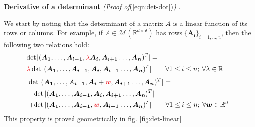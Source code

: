 \documentclass[../template.tex]{subfiles}
\begin{document}
\begin{expl}\textbf{Derivative of a determinant} \textit{(Proof of}(\ref{eqn:det-dot})\textit{)}  . \label{proof:det-dot} 

    We start by noting that the determinant of a matrix $A$ is a linear function of its rows or columns. For example, if $A \in \mathcal{M}(\mathbb{R}^{d \times d})$ has rows $\{\bm{A_i}\}_{i=1,\dots,n}$, then the following two relations hold:
    \begin{align} \label{eqn:prop1}
        \operatorname{det}|(\bm{A_1},\dots,\bm{A_{i-1}}, \textcolor{Red}{\lambda}\bm{A_i}, \bm{A_{i+1}}\dots, \bm{A_n})^T| = \\ \nonumber
       \textcolor{Red}{\lambda} \operatorname{det} | (\bm{A_1},\dots,\bm{A_{i-1}}, \bm{A_i} , \bm{A_{i+1}}\dots, \bm{A_n})^T| \qquad \forall 1 \leq i \leq n; \> \forall \lambda \in \mathbb{R} \span
    \end{align}
    \begin{align} \label{eqn:prop2}
       &\operatorname{det}|(\bm{A_1},\dots,\bm{A_{i-1}}, \bm{A_i} + \textcolor{Red}{\bm{w}}, \bm{A_{i+1}}\dots, \bm{A_n})^T| = \\ \nonumber
       &\hphantom{+}\operatorname{det} | (\bm{A_1},\dots,\bm{A_{i-1}}, \bm{A_i} , \bm{A_{i+1}}\dots, \bm{A_n})^T| +\\ \nonumber
       &\operatorname{+det} | (\bm{A_1},\dots,\bm{A_{i-1}}, \textcolor{Red}{\bm{w}}, \bm{A_{i+1}}\dots, \bm{A_n})^T|
       \qquad \forall 1 \leq i \leq n; \> \forall \bm{w} \in \mathbb{R}^d 
    \end{align}
    This property is proved geometrically in fig. \ref{fig:det-linear}.

    \medskip


\end{expl}
\end{document}
